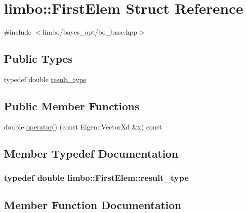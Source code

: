 \hypertarget{structlimbo_1_1_first_elem}{}\section{limbo\+:\+:First\+Elem Struct Reference}
\label{structlimbo_1_1_first_elem}


{\ttfamily \#include $<$limbo/bayes\+\_\+opt/bo\+\_\+base.\+hpp$>$}

\subsection*{Public Types}
\begin{DoxyCompactItemize}
\item 
typedef double \hyperlink{structlimbo_1_1_first_elem_a8807f1723bc06dce8929cf77cf0751bc}{result\+\_\+type}
\end{DoxyCompactItemize}
\subsection*{Public Member Functions}
\begin{DoxyCompactItemize}
\item 
double \hyperlink{structlimbo_1_1_first_elem_a6816ea8e21acec76f91542776ab02422}{operator()} (const Eigen\+::\+Vector\+Xd \&x) const 
\end{DoxyCompactItemize}


\subsection{Member Typedef Documentation}
\hypertarget{structlimbo_1_1_first_elem_a8807f1723bc06dce8929cf77cf0751bc}{}
\subsubsection[{result\+\_\+type}]{\setlength{\rightskip}{0pt plus 5cm}typedef double {\bf limbo\+::\+First\+Elem\+::result\+\_\+type}}\label{structlimbo_1_1_first_elem_a8807f1723bc06dce8929cf77cf0751bc}


\subsection{Member Function Documentation}
\hypertarget{structlimbo_1_1_first_elem_a6816ea8e21acec76f91542776ab02422}{}

